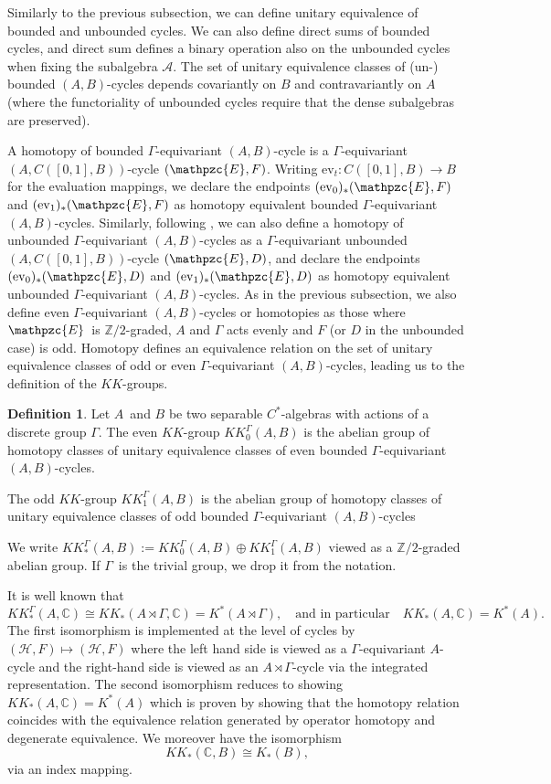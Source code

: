\documentclass[a4paper,reqno]{amsart}
\numberwithin{equation}{section}
\def\C{\mathbb{C}}
\def\Z{\mathbb{Z}}
\theoremstyle{definition}
\newtheorem{definition}[thm]{Definition}
\theoremstyle{remark}
\begin{document}
Similarly to the previous subsection, we can define unitary equivalence of bounded and unbounded cycles. We can also define direct sums of bounded cycles, and direct sum defines a binary operation also on the unbounded cycles when fixing the subalgebra $\mathcal{A}$. The set of unitary equivalence classes of (un-) bounded $(A,B)$-cycles depends covariantly on $B$ and contravariantly on $A$ (where the functoriality of unbounded cycles require that the dense subalgebras are preserved). 


A homotopy of bounded $\Gamma$-equivariant $(A,B)$-cycle is a $\Gamma$-equivariant $(A,C([0,1],B))$-cycle $(\mathpzc{E},F)$. Writing $\mathrm{ev}_t:C([0,1],B)\to B$ for the evaluation mappings, we declare the endpoints $(\mathrm{ev}_0)_*(\mathpzc{E},F)$ and $(\mathrm{ev}_1)_*(\mathpzc{E},F)$ as homotopy equivalent bounded $\Gamma$-equivariant $(A,B)$-cycles. Similarly, following \cite{kaadhomoun}, we can also define a homotopy of unbounded $\Gamma$-equivariant $(A,B)$-cycles as a $\Gamma$-equivariant unbounded $(A,C([0,1],B))$-cycle $(\mathpzc{E},D)$, and declare the endpoints $(\mathrm{ev}_0)_*(\mathpzc{E},D)$ and $(\mathrm{ev}_1)_*(\mathpzc{E},D)$ as homotopy equivalent unbounded $\Gamma$-equivariant $(A,B)$-cycles. As in the previous subsection, we also define even $\Gamma$-equivariant $(A,B)$-cycles or homotopies as those where $\mathpzc{E}$ is $\Z/2$-graded, $A$ and $\Gamma$ acts evenly and $F$ (or $D$ in the unbounded case) is odd. Homotopy defines an equivalence relation on the set of unitary equivalence classes of odd or even $\Gamma$-equivariant $(A,B)$-cycles, leading us to the definition of the $KK$-groups.




\begin{definition}
Let $A$ and $B$ be two separable $C^*$-algebras with actions of a discrete group $\Gamma$. The even $KK$-group $KK_0^\Gamma(A,B)$ is the abelian group of homotopy classes of unitary equivalence classes of even bounded $\Gamma$-equivariant $(A,B)$-cycles.
 
The odd $KK$-group $KK_1^\Gamma(A,B)$ is the abelian group of homotopy classes of unitary equivalence classes of odd bounded $\Gamma$-equivariant $(A,B)$-cycles


We write $KK_*^\Gamma(A,B):=KK_0^\Gamma(A,B)\oplus KK_1^\Gamma(A,B)$ viewed as a $\Z/2$-graded abelian group. If $\Gamma$ is the trivial group, we drop it from the notation.
\end{definition}


It is well known that 
$$KK_*^\Gamma(A,\C)\cong KK_*(A\rtimes\Gamma,\C)=K^*(A\rtimes\Gamma), \quad\mbox{and in particular} \quad KK_*(A,\C)=K^*(A).$$
The first isomorphism is implemented at the level of cycles by $(\mathcal{H},F)\mapsto (\mathcal{H},F)$ where the left hand side is viewed as a $\Gamma$-equivariant $A$-cycle and the right-hand side is viewed as an $A\rtimes\Gamma$-cycle via the integrated representation. The second isomorphism reduces to showing $KK_*(A,\C)=K^*(A)$ which is proven \cite{higsonroe} by showing that the homotopy relation coincides with the equivalence relation generated by operator homotopy and degenerate equivalence. We moreover have the isomorphism \cite[Chapter 17.5]{Blackadar}
$$KK_*(\C,B)\cong K_*(B),$$
via an index mapping.
\end{document}
